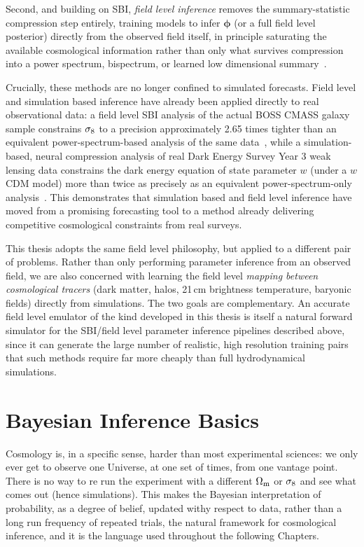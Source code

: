 Second, and building on SBI, \emph{field level inference} removes the summary-statistic compression step entirely, training models to infer $\bm{\phi}$ (or a full field level posterior) directly from the observed field itself, in principle saturating the available cosmological information rather than only what survives compression into a power spectrum, bispectrum, or learned low dimensional summary~\citep[e.g.][]{jamieson_field-level_2023}.

Crucially, these methods are no longer confined to simulated forecasts. Field level and simulation based inference have already been applied directly to real observational data: a field level SBI analysis of the actual BOSS CMASS galaxy sample constrains $\sigma_8$ to a precision approximately 2.65 times tighter than an equivalent power-spectrum-based analysis of the same data~\citep{lemos2023simbigfieldlevelsimulationbasedinference}, while a simulation-based, neural compression analysis of real Dark Energy Survey Year 3 weak lensing data constrains the dark energy equation of state parameter $w$ (under a $w$CDM model) more than twice as precisely as an equivalent power-spectrum-only analysis~\citep{jeffrey2024darkenergysurveyyear}. This demonstrates that simulation based and field level inference have moved from a promising forecasting tool to a method already delivering competitive cosmological constraints from real surveys.

This thesis adopts the same field level philosophy, but applied to a different pair of problems. Rather than only performing parameter inference from an observed field, we are also concerned with learning the field level \emph{mapping between cosmological tracers} (dark matter, halos, 21\,cm brightness temperature, baryonic fields) directly from simulations. The two goals are complementary. An accurate field level emulator of the kind developed in this thesis is itself a natural forward simulator for the SBI/field level parameter inference pipelines described above, since it can generate the large number of realistic, high resolution training pairs that such methods require far more cheaply than full hydrodynamical simulations.


\section{Bayesian Inference Basics}
\label{sec:bayesian_basics}

Cosmology is, in a specific sense, harder than most experimental sciences: we only ever get to observe one Universe, at one set of times, from one vantage point. There is no way to re run the experiment with a different $\Omega_\mathrm{m}$ or $\sigma_8$ and see what comes out (hence simulations). This makes the Bayesian interpretation of probability, as a degree of belief, updated withy respect to data, rather than a long run frequency of repeated trials, the natural framework for cosmological inference, and it is the language used throughout the following Chapters.

